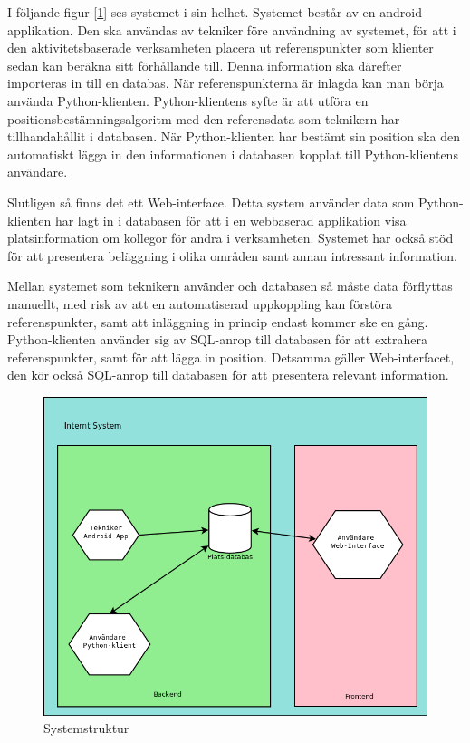 \documentclass[swedish, a4paper,12pt]{article}
\begin{document}
I följande figur [\ref{fig:systemStruktur}] %
ses systemet i sin helhet. Systemet består av en android applikation. Den ska användas av tekniker före användning av systemet, för att i den aktivitetsbaserade verksamheten placera ut referenspunkter som klienter sedan kan beräkna sitt förhållande till. Denna information ska därefter importeras in till en databas. När referenspunkterna är inlagda kan man börja använda Python-klienten. Python-klientens syfte är att utföra en positionsbestämningsalgoritm med den referensdata som teknikern har tillhandahållit i databasen. När Python-klienten har bestämt sin position ska den automatiskt lägga in den informationen i databasen kopplat till Python-klientens användare.

Slutligen så finns det ett Web-interface. Detta system använder data som Python-klienten har lagt in i databasen för att i en webbaserad applikation visa platsinformation om kollegor för andra i verksamheten. Systemet har också stöd för att presentera beläggning i olika områden samt annan intressant information.

Mellan systemet som teknikern använder och databasen så måste data förflyttas manuellt, med risk av att en automatiserad uppkoppling kan förstöra referenspunkter, samt att inläggning in princip endast kommer ske en gång. Python-klienten använder sig av SQL-anrop till databasen för att extrahera referenspunkter, samt för att lägga in position. Detsamma gäller Web-interfacet, den kör också SQL-anrop till databasen för att presentera relevant information. %

\begin{figure}[H]
	\includegraphics[width=15cm]{media/systemStruktur.png}
	\caption{Systemstruktur}
	\label{fig:systemStruktur}
\end{figure}
\end{document}
